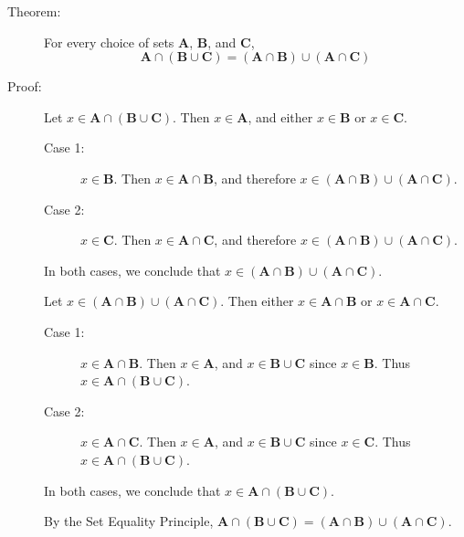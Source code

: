 \documentclass{article}
\newcommand\A{\mathbf A}
\newcommand\B{\mathbf B}
\newcommand\C{\mathbf C}
\newcommand{\0}{\mathbf 0}
\newcommand{\1}{\mathbf 1}
\begin{document}
\begin{description}
  \item[Theorem:] For every choice of sets $\A$, $\B$, and $\C$,
    \begin{equation*}
    \A \cap (\B \cup \C) = (\A \cap \B) \cup (\A \cap \C)
    \end{equation*}

 \item[Proof:] Let $x \in \A \cap (\B \cup \C)$. Then $x \in \A$, and either $x \in \B$ or $x \in \C$.
   \begin{description}
     \item[Case 1:] $x \in \B$. Then $x \in \A \cap \B$, and therefore $x \in (\A \cap \B) \cup (\A \cap \C)$.
     \item[Case 2:] $x \in \C$. Then $x \in \A \cap \C$, and therefore $x \in (\A \cap \B) \cup (\A \cap \C)$.
   \end{description}
   In both cases, we conclude that $x \in (\A \cap \B) \cup (\A \cap \C)$.

   Let $x \in (\A \cap \B) \cup (\A \cap \C)$. Then either $x \in \A \cap \B$ or $x \in \A \cap \C$.
   \begin{description}
     \item[Case 1:] $x \in \A \cap \B$. Then $x \in \A$, and $x \in \B \cup \C$ since $x \in \B$. Thus $x \in \A \cap (\B \cup \C)$.
     \item[Case 2:] $x \in \A \cap \C$. Then $x \in \A$, and $x \in \B \cup \C$ since $x \in \C$. Thus $x \in \A \cap (\B \cup \C)$.
   \end{description}
   In both cases, we conclude that $x \in \A \cap (\B \cup \C)$.

   By the Set Equality Principle, $\A \cap (\B \cup \C) = (\A \cap \B) \cup (\A \cap \C)$.
\end{description}
\end{document}
